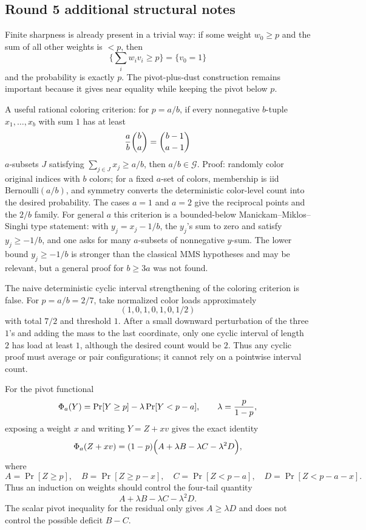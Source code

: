 \documentclass[12pt]{article}
\begin{document}
\subsection*{Round 5 additional structural notes}

Finite sharpness is already present in a trivial way: if some weight \(w_0\ge p\)
and the sum of all other weights is \(<p\), then
\[
   \{\sum_i w_i v_i\ge p\}=\{v_0=1\}
\]
and the probability is exactly \(p\).  The pivot-plus-dust construction remains
important because it gives near equality while keeping the pivot below \(p\).

A useful rational coloring criterion: for \(p=a/b\), if every nonnegative
\(b\)-tuple \(x_1,\ldots,x_b\) with sum \(1\) has at least
\[
   {a\over b}\binom ba=\binom{b-1}{a-1}
\]
\(a\)-subsets \(J\) satisfying \(\sum_{j\in J}x_j\ge a/b\), then \(a/b\in
\mathcal G\).  Proof: randomly color original indices with \(b\) colors; for a
fixed \(a\)-set of colors, membership is iid Bernoulli\((a/b)\), and symmetry
converts the deterministic color-level count into the desired probability.
The cases \(a=1\) and \(a=2\) give the reciprocal points and the \(2/b\) family.
For general \(a\) this criterion is a bounded-below Manickam--Miklos--Singhi
type statement: with \(y_j=x_j-1/b\), the \(y_j\)'s sum to zero and satisfy
\(y_j\ge -1/b\), and one asks for many \(a\)-subsets of nonnegative \(y\)-sum.
The lower bound \(y_j\ge-1/b\) is stronger than the classical MMS hypotheses
and may be relevant, but a general proof for \(b\ge3a\) was not found.

The naive deterministic cyclic interval strengthening of the coloring criterion
is false.  For \(p=a/b=2/7\), take normalized color loads approximately
\[
   (1,0,1,0,1,0,1/2)
\]
with total \(7/2\) and threshold \(1\).  After a small downward perturbation of
the three \(1\)'s and adding the mass to the last coordinate, only one cyclic
interval of length \(2\) has load at least \(1\), although the desired count
would be \(2\).  Thus any cyclic proof must average or pair configurations; it
cannot rely on a pointwise interval count.

For the pivot functional
\[
 \Phi_a(Y)=\Pr[Y\ge p]-\lambda\Pr[Y<p-a],\qquad \lambda={p\over1-p},
\]
exposing a weight \(x\) and writing \(Y=Z+xv\) gives the exact identity
\[
\Phi_a(Z+xv)
=(1-p)\Bigl(A+\lambda B-\lambda C-\lambda^2D\Bigr),
\]
where
\[
 A=\Pr[Z\ge p],\quad
 B=\Pr[Z\ge p-x],\quad
 C=\Pr[Z<p-a],\quad
 D=\Pr[Z<p-a-x].
\]
Thus an induction on weights should control the four-tail quantity
\[
 A+\lambda B-\lambda C-\lambda^2D.
\]
The scalar pivot inequality for the residual only gives \(A\ge \lambda D\) and
does not control the possible deficit \(B-C\).
\end{document}

